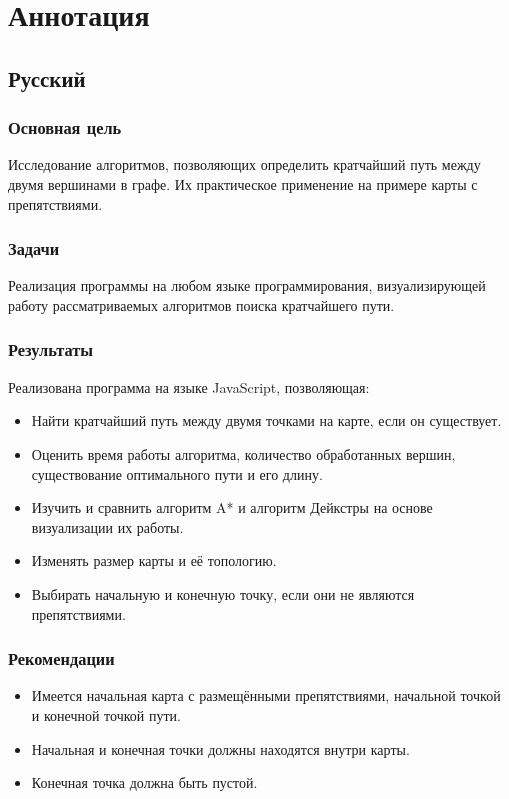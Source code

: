 \section{Аннотация}


\subsection{Русский}

\subsubsection{Основная цель}
Исследование алгоритмов, позволяющих определить кратчайший путь между двумя вершинами в графе. Их практическое применение на примере карты с препятствиями. 

\subsubsection{Задачи}
Реализация программы на любом языке программирования, визуализирующей работу рассматриваемых алгоритмов поиска кратчайшего пути.

\subsubsection{Результаты}
Реализована программа на языке JavaScript, позволяющая:
\begin{itemize}
  \item Найти кратчайший путь между двумя точками на карте, если он существует.
  \item Оценить время работы алгоритма, количество обработанных вершин, существование оптимального пути и его длину.
  \item Изучить и сравнить алгоритм A* и алгоритм Дейкстры на основе визуализации их работы.
  \item Изменять размер карты и её топологию.
  \item Выбирать начальную и конечную точку, если они не являются препятствиями.
\end{itemize}

\subsubsection{Рекомендации}
\begin{itemize}
  \item Имеется начальная карта с размещёнными препятствиями, начальной точкой и конечной точкой пути.
  \item Начальная и конечная точки должны находятся внутри карты.
  \item Конечная точка должна быть пустой.
\end{itemize}




